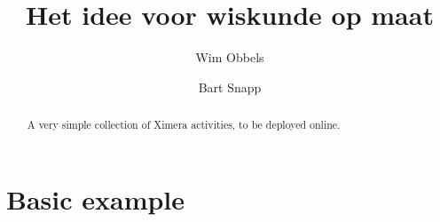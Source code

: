 \documentclass{xourse}
\author{Wim Obbels \and Bart Snapp}
\title{Het idee voor wiskunde op maat}
\begin{document}
\begin{abstract}
    A very simple collection of Ximera activities, 
    to be deployed online.
\end{abstract}
\maketitle

\part{Basic example}

\chapterstyle
    \sectionstyle

    \chapterstyle
\end{document}
